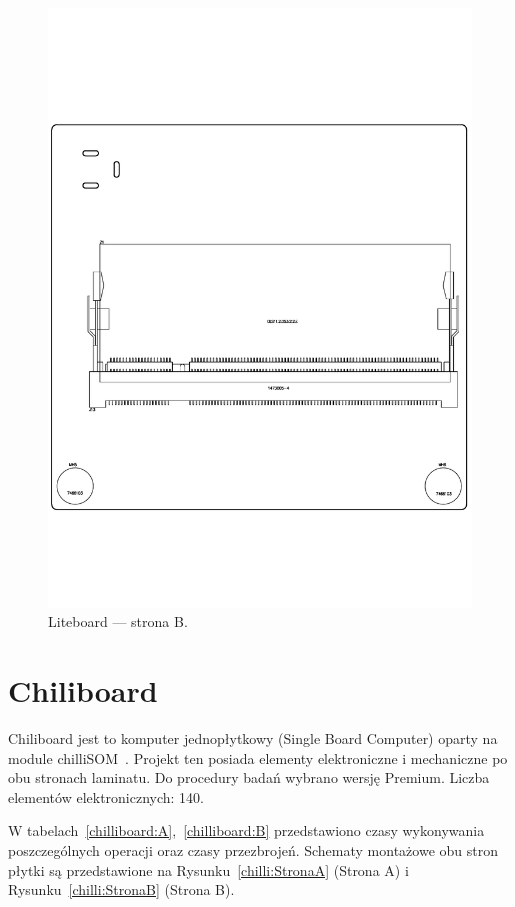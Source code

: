 \begin{figure}[H]
	\centering
	\includegraphics[width=0.7\linewidth,clip, trim=0cm 4cm 0cm 4cm]{./chapters/chapter5/liteboard_B.pdf}
	\caption{Liteboard --- strona B.}\label{liteboard:StronaB}
\end{figure}

\section{Chiliboard}

Chiliboard jest to komputer jednopłytkowy (Single Board Computer) oparty na module chilliSOM~\cite{chiliboard}. Projekt ten posiada elementy elektroniczne i mechaniczne po obu stronach laminatu. Do procedury badań wybrano wersję Premium. Liczba elementów elektronicznych: 140.

\breakparagraph{}
W tabelach~\ref{chilliboard:A},\ \ref{chilliboard:B} przedstawiono czasy wykonywania poszczególnych operacji oraz czasy przezbrojeń. Schematy montażowe obu stron płytki są przedstawione na Rysunku~\ref{chilli:StronaA} (Strona A) i Rysunku~\ref{chilli:StronaB} (Strona B).

